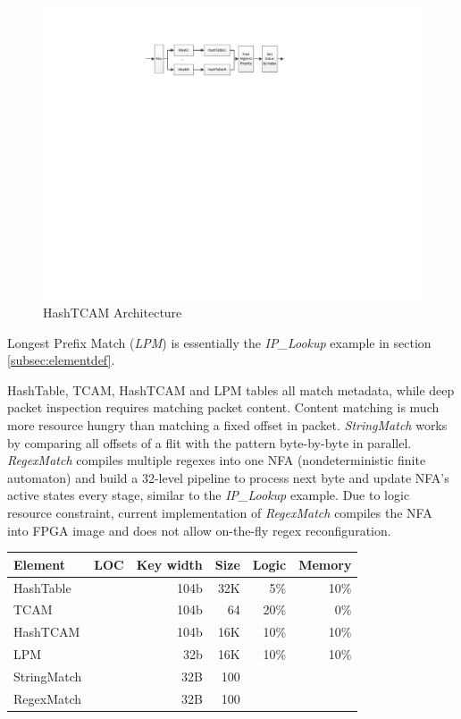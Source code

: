 \begin{figure}[h!]
	\centering
	\includegraphics[width=1.0\columnwidth]{image/HashTCAM}
	\vspace{-0.30in}
	\caption{HashTCAM Architecture}
	\vspace{-0.10in}
	\label{fig:HashTCAM}
\end{figure}

Longest Prefix Match (\textit{LPM}) is essentially the \textit{IP\_Lookup} example in section \ref{subsec:elementdef}.

HashTable, TCAM, HashTCAM and LPM tables all match metadata, while deep packet inspection requires matching packet content. Content matching is much more resource hungry than matching a fixed offset in packet. \textit{StringMatch} works by comparing all offsets of a flit with the pattern byte-by-byte in parallel. \textit{RegexMatch} compiles multiple regexes into one NFA (nondeterministic finite automaton) and build a 32-level pipeline to process next byte and update NFA's active states every stage, similar to the \textit{IP\_Lookup} example. Due to logic resource constraint, current implementation of \textit{RegexMatch} compiles the NFA into FPGA image and does not allow on-the-fly regex reconfiguration.

\begin{table}[h!]
	\centering
	\label{tab:LookupTables}
	\begin{tabular}{l|r|r|r|r|r}
		Element & LOC & Key width & Size & Logic & Memory \\
		\hline
		HashTable 	& & 104b & 32K 	& 5\%  & 10\% \\
		TCAM 		& & 104b & 64	& 20\% & 0\% \\
		HashTCAM 	& & 104b & 16K    & 10\% & 10\% \\
		LPM			& & 32b  & 16K    & 10\% & 10\% \\
		StringMatch & & 32B  & 100	& & \\
		RegexMatch  & & 32B  & 100  & & \\
	\end{tabular}
\end{table}

